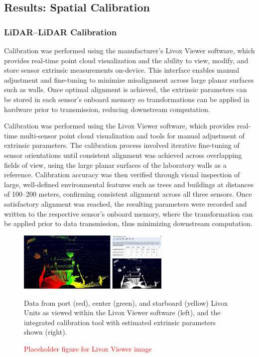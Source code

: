 \documentclass{erauthesis}
\begin{document}
\subsection{Results: Spatial Calibration}
\label{sec:spatial_calib_results}

\subsubsection{LiDAR–LiDAR Calibration} \label{results_lidarLidar_calib}

Calibration was performed using the manufacturer’s Livox Viewer software, which provides real-time point cloud visualization and the ability to view, modify, and store sensor extrinsic measurements on-device.
This interface enables manual adjustment and fine-tuning to minimize misalignment across large planar surfaces such as walls.  
Once optimal alignment is achieved, the extrinsic parameters can be stored in each sensor’s onboard memory so transformations can be applied in hardware prior to transmission, reducing downstream computation.

Calibration was performed using the Livox Viewer software, which provides real-time multi-sensor point cloud visualization and tools for manual adjustment of extrinsic parameters. 
The calibration process involved iterative fine-tuning of sensor orientations until consistent alignment was achieved across overlapping fields of view, using the large planar surfaces of the laboratory walls as a reference. 
Calibration accuracy was then verified through visual inspection of large, well-defined environmental features such as trees and buildings at distances of 100–200 meters, confirming consistent alignment across all three sensors.
Once satisfactory alignment was reached, the resulting parameters were recorded and written to the respective sensor’s onboard memory, where the transformation can be applied prior to data transmission, thus minimizing downstream computation. 

\begin{figure}[ht]
\centering
        \includegraphics[width=0.65\textwidth]{Images/livox_viewer.png}
        \caption{Data from port (red), center (green), and starboard (yellow) Livox Units as viewed within the Livox Viewer software (left), and the integrated calibration tool with estimated extrinsic parameters shown (right). }
\caption{\textcolor{red}{Placeholder figure for Livox Viewer image}}
\label{fig:LidarLidar_calib}
\end{figure}
\end{document}
